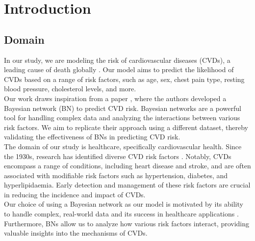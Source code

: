 \documentclass[letterpaper]{article}
\begin{document}
\section{Introduction}
\subsection{Domain}

In our study, we are modeling the risk of cardiovascular diseases (CVDs), a leading cause of death globally \cite{WHO2024}. Our model aims to predict the likelihood of CVDs based on a range of risk factors, such as age, sex, chest pain type, resting blood pressure, cholesterol levels, and more. \\
Our work draws inspiration from a paper \cite{ORDOVAS2023107405}, where the authors developed a Bayesian network (BN) to predict CVD risk. Bayesian networks are a powerful tool for handling complex data and analyzing the interactions between various risk factors. We aim to replicate their approach using a different dataset, thereby validating the effectiveness of BNs in predicting CVD risk.\\
The domain of our study is healthcare, specifically cardiovascular health. 
Since the 1930s, research has identified diverse CVD risk factors \cite{MAHMOOD2014999}. Notably, CVDs encompass a range of conditions, including heart disease and stroke, and are often associated with modifiable risk factors such as hypertension, diabetes, and hyperlipidaemia. Early detection and management of these risk factors are crucial in reducing the incidence and impact of CVDs. \\
Our choice of using a Bayesian network as our model is motivated by its ability to handle complex, real-world data and its success in healthcare applications \cite{nielsen2009bayesian}. Furthermore, BNs allow us to analyze how various risk factors interact, providing valuable insights into the mechanisms of CVDs.

\end{document}
